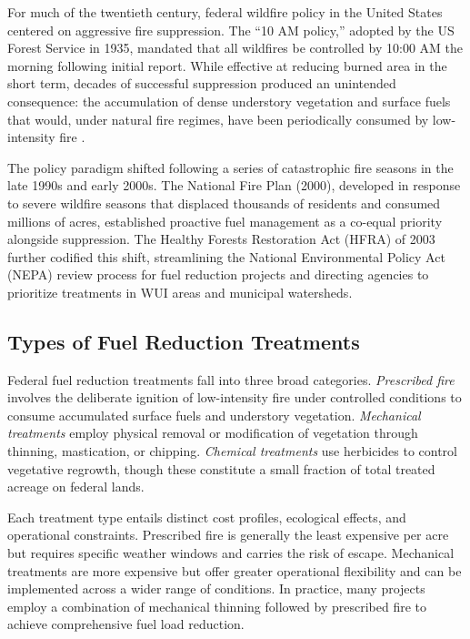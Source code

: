 \documentclass[12pt, letterpaper]{article}
\begin{document}
For much of the twentieth century, federal wildfire policy in the United States centered on aggressive fire suppression. The ``10 AM policy,'' adopted by the US Forest Service in 1935, mandated that all wildfires be controlled by 10:00 AM the morning following initial report. While effective at reducing burned area in the short term, decades of successful suppression produced an unintended consequence: the accumulation of dense understory vegetation and surface fuels that would, under natural fire regimes, have been periodically consumed by low-intensity fire \citep{agee2005}.

The policy paradigm shifted following a series of catastrophic fire seasons in the late 1990s and early 2000s. The National Fire Plan (2000), developed in response to severe wildfire seasons that displaced thousands of residents and consumed millions of acres, established proactive fuel management as a co-equal priority alongside suppression. The Healthy Forests Restoration Act (HFRA) of 2003 further codified this shift, streamlining the National Environmental Policy Act (NEPA) review process for fuel reduction projects and directing agencies to prioritize treatments in WUI areas and municipal watersheds.

\subsection{Types of Fuel Reduction Treatments}

Federal fuel reduction treatments fall into three broad categories. \textit{Prescribed fire} involves the deliberate ignition of low-intensity fire under controlled conditions to consume accumulated surface fuels and understory vegetation. \textit{Mechanical treatments} employ physical removal or modification of vegetation through thinning, mastication, or chipping. \textit{Chemical treatments} use herbicides to control vegetative regrowth, though these constitute a small fraction of total treated acreage on federal lands.

Each treatment type entails distinct cost profiles, ecological effects, and operational constraints. Prescribed fire is generally the least expensive per acre but requires specific weather windows and carries the risk of escape. Mechanical treatments are more expensive but offer greater operational flexibility and can be implemented across a wider range of conditions. In practice, many projects employ a combination of mechanical thinning followed by prescribed fire to achieve comprehensive fuel load reduction.
\end{document}
